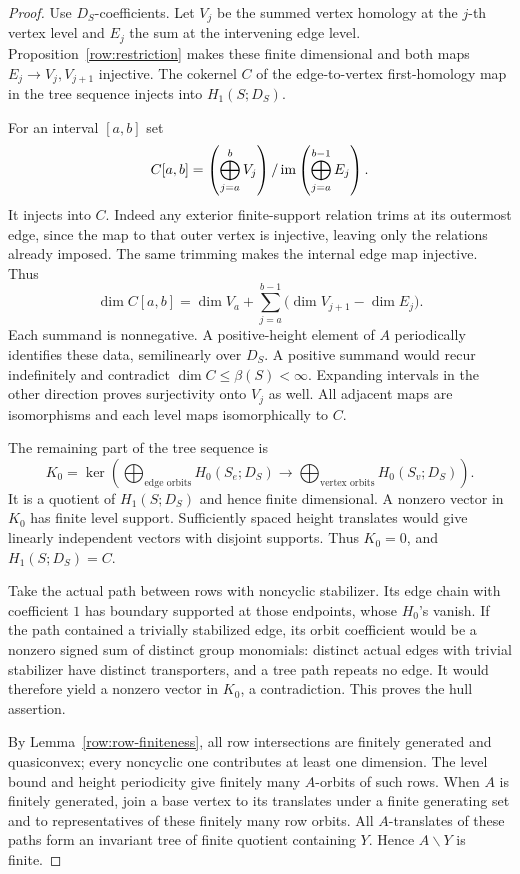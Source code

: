 \begin{proof}
Use \(D_S\)-coefficients. Let \(V_j\) be the summed vertex homology
at the \(j\)-th vertex level and \(E_j\) the sum at the intervening
edge level. Proposition~\ref{row:restriction} makes these finite
dimensional and both maps \(E_j\to V_j,V_{j+1}\) injective.
The cokernel \(C\) of the edge-to-vertex first-homology map in
the tree sequence injects into \(H_1(S;D_S)\).

For an interval \([a,b]\) set
\[
 C[a,b]=\left(\bigoplus_{j=a}^{b}V_j\right)/
             \operatorname{im}\left(\bigoplus_{j=a}^{b-1}E_j\right).
\]
It injects into \(C\). Indeed any exterior finite-support relation
trims at its outermost edge, since the map to that outer vertex
is injective, leaving only the relations already imposed.
The same trimming makes the internal edge map injective. Thus
\[
 \dim C[a,b]=\dim V_a+
       \sum_{j=a}^{b-1}\bigl(\dim V_{j+1}-\dim E_j\bigr).
\]
Each summand is nonnegative. A positive-height element of \(A\)
periodically identifies these data, semilinearly over \(D_S\).
A positive summand would recur indefinitely and contradict
\(\dim C\leq\beta(S)<\infty\).
Expanding intervals in the other direction proves surjectivity
onto \(V_j\) as well. All adjacent maps are isomorphisms and each
level maps isomorphically to \(C\).

The remaining part of the tree sequence is
\[
 K_0=\ker\left(
 \bigoplus_{\text{edge orbits}}H_0(S_e;D_S)
 \longrightarrow
 \bigoplus_{\text{vertex orbits}}H_0(S_v;D_S)\right).
\]
It is a quotient of \(H_1(S;D_S)\) and hence finite dimensional.
A nonzero vector in \(K_0\) has finite level support. Sufficiently
spaced height translates would give linearly independent vectors
with disjoint supports. Thus \(K_0=0\), and \(H_1(S;D_S)=C\).

Take the actual path between rows with noncyclic stabilizer.
Its edge chain with coefficient \(1\) has boundary supported at
those endpoints, whose \(H_0\)'s vanish. If the path contained
a trivially stabilized edge, its orbit coefficient would be a
nonzero signed sum of distinct group monomials: distinct actual
edges with trivial stabilizer have distinct transporters, and a
tree path repeats no edge. It would therefore yield a nonzero
vector in \(K_0\), a contradiction. This proves the hull assertion.

By Lemma~\ref{row:row-finiteness}, all row intersections are finitely
generated and quasiconvex; every noncyclic one contributes at least
one dimension. The level bound and height periodicity give finitely
many \(A\)-orbits of such rows. When \(A\) is finitely generated,
join a base vertex to its translates under a finite generating set
and to representatives of these finitely many row orbits.
All \(A\)-translates of these paths form an invariant tree of finite
quotient containing \(Y\). Hence \(A\backslash Y\) is finite.


\end{proof}
